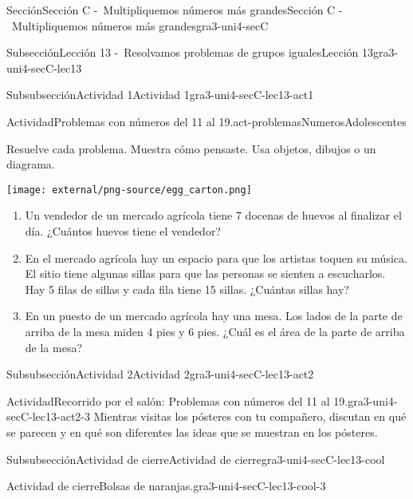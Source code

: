\documentclass[twoside,14pt,]{extarticle}
\begin{document}
\begin{sectionptx}{Sección}{Sección C -~Multipliquemos números más grandes}{}{Sección C -~Multipliquemos números más grandes}{}{}{gra3-uni4-secC}
\begin{subsectionptx}{Subsección}{Lección 13 -~Resolvamos problemas de grupos iguales}{}{Lección 13}{}{}{gra3-uni4-secC-lec13}
\begin{subsubsectionptx}{Subsubsección}{Actividad 1}{}{Actividad 1}{}{}{gra3-uni4-secC-lec13-act1}
\begin{activity}{Actividad}{Problemas con números del 11 al 19.}{act-problemasNumerosAdolescentes}
\begin{sidebyside}{2}{0.05}{0.05}{0.1}%
\begin{sbspanel}{0.5}%
Resuelve cada problema. Muestra cómo pensaste. Usa objetos, dibujos o un diagrama.%
\end{sbspanel}%
\begin{sbspanel}{0.3}%
\texttt{[image: external/png-source/egg\_carton.png]}
\end{sbspanel}%
\end{sidebyside}%
%
\begin{enumerate}
\item{}Un vendedor de un mercado agrícola tiene 7 docenas de huevos al finalizar el día. ¿Cuántos huevos tiene el vendedor?%
\item{}En el mercado agrícola hay un espacio para que los artistas toquen su música. El sitio tiene algunas sillas para que las personas se sienten a escucharlos. Hay 5 filas de sillas y cada fila tiene 15 sillas. ¿Cuántas sillas hay?%
\item{}En un puesto de un mercado agrícola hay una mesa. Los lados de la parte de arriba de la mesa miden 4 pies y 6 pies. ¿Cuál es el área de la parte de arriba de la mesa?%
\end{enumerate}
\end{activity}%
\end{subsubsectionptx}
%
%
\typeout{************************************************}
\typeout{************************************************}
%
\begin{subsubsectionptx}{Subsubsección}{Actividad 2}{}{Actividad 2}{}{}{gra3-uni4-secC-lec13-act2}
\begin{activity}{Actividad}{Recorrido por el salón: Problemas con números del 11 al 19.}{gra3-uni4-secC-lec13-act2-3}%
Mientras visitas los pósteres con tu compañero, discutan en qué se parecen y en qué son diferentes las ideas que se muestran en los pósteres.%
\end{activity}%
\end{subsubsectionptx}
%
%
\typeout{************************************************}
\typeout{************************************************}
%
\begin{subsubsectionptx}{Subsubsección}{Actividad de cierre}{}{Actividad de cierre}{}{}{gra3-uni4-secC-lec13-cool}
\begin{project}{Actividad de cierre}{Bolsas de naranjas.}{gra3-uni4-secC-lec13-cool-3}%

\end{project}
\end{subsubsectionptx}
\end{subsectionptx}
\end{sectionptx}
\end{document}
